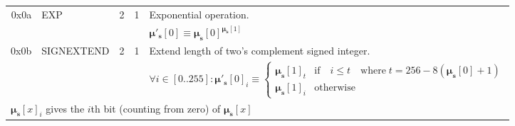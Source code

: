 \documentclass[9pt,oneside]{amsart}
\begin{document}
\begin{tabular*}{\columnwidth}[h]{rlrrl}
\midrule
0x0a & {\small EXP} & 2 & 1 & Exponential operation. \\
&&&& $\boldsymbol{\mu}'_\mathbf{s}[0] \equiv \boldsymbol{\mu}_\mathbf{s}[0] ^ {\boldsymbol{\mu}_\mathbf{s}[1] }$ \\
\midrule
0x0b & {\small SIGNEXTEND} & 2 & 1 & Extend length of two's complement signed integer. \\
&&&& $ \forall i \in [0..255]: \boldsymbol{\mu}'_\mathbf{s}[0]_i \equiv \begin{cases} \boldsymbol{\mu}_\mathbf{s}[1]_t &\text{if} \quad i \leqslant t \quad \text{where} \; t = 256 - 8(\boldsymbol{\mu}_\mathbf{s}[0] + 1) \\ \boldsymbol{\mu}_\mathbf{s}[1]_i &\text{otherwise} \end{cases}$ \\
\multicolumn{5}{l}{$\boldsymbol{\mu}_\mathbf{s}[x]_i$ gives the $i$th bit (counting from zero) of $\boldsymbol{\mu}_\mathbf{s}[x]$} \vspace{5pt} \\
\end{tabular*}
\end{document}

